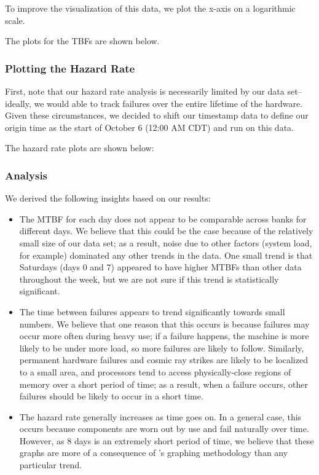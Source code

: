 To improve the visualization of this data, we plot the x-axis on a logarithmic scale.

The plots for the TBFs are shown below.

\subsubsection{Plotting the Hazard Rate}

First, note that our hazard rate analysis is necessarily limited by our data set--ideally, we would able to track failures over the entire lifetime of the hardware.  Given these circumstances, we decided to shift our timestamp data to define our origin time as the start of October 6 (12:00 AM CDT) and run  on this data.

The hazard rate plots are shown below:

\subsubsection{Analysis}

We derived the following insights based on our results:

\begin{itemize}
\item The MTBF for each day does not appear to be comparable across banks for different days.  We believe that this could be the case because of the relatively small size of our data set; as a result, noise due to other factors (system load, for example) dominated any other trends in the data.  One small trend is that Saturdays (days 0 and 7) appeared to have higher MTBFs than other data throughout the week, but we are not sure if this trend is statistically significant.
\item The time between failures appears to trend significantly towards small numbers.  We believe that one reason that this occurs is because failures may occur more often during heavy use; if a failure happens, the machine is more likely to be under more load, so more failures are likely to follow.  Similarly, permanent hardware failures and cosmic ray strikes are likely to be localized to a small area, and processors tend to access physically-close regions of memory over a short period of time; as a result, when a failure occurs, other failures should be likely to occur in a short time.
\item The hazard rate generally increases as time goes on.  In a general case, this occurs because components are worn out by use and fail naturally over time.  However, as 8 days is an extremely short period of time, we believe that these graphs are more of a consequence of 's graphing methodology than any particular trend. 
\end{itemize}
